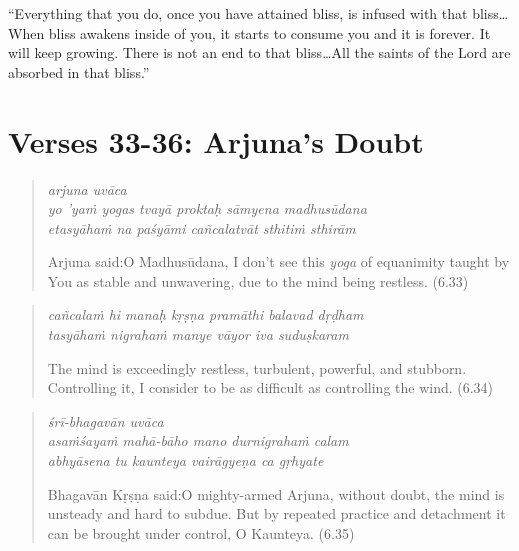 \documentclass[12pt, twoside, openright]{memoir}
\begin{document}
\enquote{Everything that you do, once you have attained bliss, is infused with that bliss\ldots When bliss awakens inside of you, it starts to consume you and it is forever. It will keep growing. There is not an end to that bliss\ldots All the saints of the Lord are absorbed in that bliss.}

\section{Verses 33-36: Arjuna's Doubt}\label{sec-verses-33-36-arjuna-s-doubt}


\par
\begin{verse}
\textit{arjuna uvāca} \\
\textit{yo ’yaṁ yogas tvayā proktaḥ sāmyena madhusūdana} \\
\textit{etasyāhaṁ na paśyāmi cañcalatvāt sthitiṁ sthirām}

\noindent \quad Arjuna said:\linebreak O Madhusūdana, I don't see this \textit{yoga} of equanimity taught by You as stable and unwavering, due to the mind being restless. (6.33)
\end{verse}
\par



\par
\begin{verse}
\textit{cañcalaṁ hi manaḥ kṛṣṇa pramāthi balavad dṛḍham} \\
\textit{tasyāhaṁ nigrahaṁ manye vāyor iva suduṣkaram}

\noindent The mind is exceedingly restless, turbulent, powerful, and stubborn. Controlling it, I consider to be as difficult as controlling the wind. (6.34)
\end{verse}
\par



\par
\begin{verse}
\textit{śrī-bhagavān uvāca} \\
\textit{asaṁśayaṁ mahā-bāho mano durnigrahaṁ calam} \\
\textit{abhyāsena tu kaunteya vairāgyeṇa ca gṛhyate}

\noindent \quad Bhagavān Kṛṣṇa said:\linebreak O mighty-armed Arjuna, without doubt, the mind is unsteady and hard to subdue. But by repeated practice and detachment it can be brought under control, O Kaunteya. (6.35)
\end{verse}
\par
\end{document}
